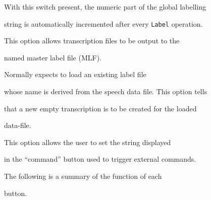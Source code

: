 \begin{optlist}


   With this switch present, the numeric part of the global labelling


  string is automatically incremented after every \texttt{Label} operation.





   This option allows transcription files to be output to the


  named master label file (MLF). 





   Normally  expects to load an existing label file


  whose name is derived from the speech data file. This option tells 


   that a new empty transcription is to be created for the loaded 


  data-file.





   This option allows the user to set the string displayed


  in the ``command'' button used to trigger external commands.





\stdoptF


\stdoptG


\stdoptI


\stdoptL


\stdoptX


\end{optlist}







The following is a summary of the function of each 


button.





